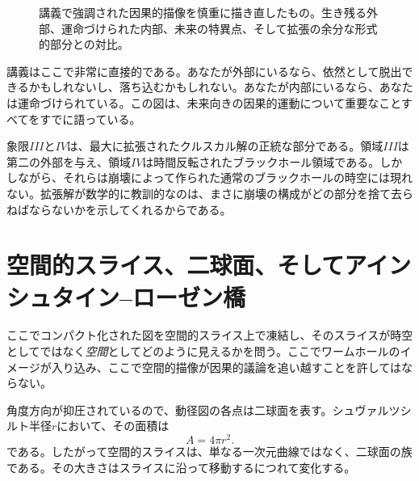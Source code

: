 \begin{figure}[htbp]
\centering
{}
\caption{講義で強調された因果的描像を慎重に描き直したもの。生き残る外部、運命づけられた内部、未来の特異点、そして拡張の余分な形式的部分との対比。}
\end{figure}

講義はここで非常に直接的である。あなたが外部にいるなら、依然として脱出できるかもしれないし、落ち込むかもしれない。あなたが内部にいるなら、あなたは運命づけられている。この図は、未来向きの因果的運動について重要なことすべてをすでに語っている。

象限\(III\)と\(IV\)は、最大に拡張されたクルスカル解の正統な部分である。領域\(III\)は第二の外部を与え、領域\(IV\)は時間反転されたブラックホール領域である。しかしながら、それらは崩壊によって作られた通常のブラックホールの時空には現れない。拡張解が数学的に教訓的なのは、まさに崩壊の構成がどの部分を捨て去らねばならないかを示してくれるからである。

\section{空間的スライス、二球面、そしてアインシュタイン--ローゼン橋}

ここでコンパクト化された図を空間的スライス上で凍結し、そのスライスが時空としてではなく\emph{空間}としてどのように見えるかを問う。ここでワームホールのイメージが入り込み、ここで空間的描像が因果的議論を追い越すことを許してはならない。

角度方向が抑圧されているので、動径図の各点は二球面を表す。シュヴァルツシルト半径\(r\)において、その面積は
\begin{equation}
A=4\pi r^2.
\end{equation}
である。したがって空間的スライスは、単なる一次元曲線ではなく、二球面の族である。その大きさはスライスに沿って移動するにつれて変化する。

